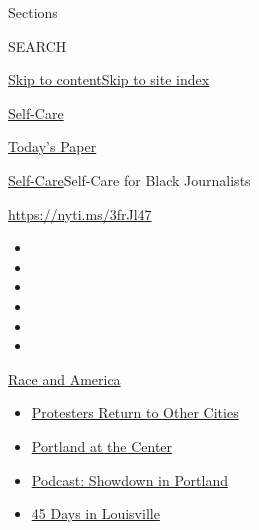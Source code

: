 Sections

SEARCH

\protect\hyperlink{site-content}{Skip to
content}\protect\hyperlink{site-index}{Skip to site index}

\href{https://www.nytimes3xbfgragh.onion/section/style/self-care/}{Self-Care}

\href{https://myaccount.nytimes3xbfgragh.onion/auth/login?response_type=cookie\&client_id=vi}{}

\href{https://www.nytimes3xbfgragh.onion/section/todayspaper}{Today's
Paper}

\href{/section/style/self-care/}{Self-Care}\textbar{}Self-Care for Black
Journalists

\url{https://nyti.ms/3frJl47}

\begin{itemize}
\item
\item
\item
\item
\item
\item
\end{itemize}

\href{https://www.nytimes3xbfgragh.onion/news-event/george-floyd-protests-minneapolis-new-york-los-angeles?action=click\&pgtype=Article\&state=default\&region=TOP_BANNER\&context=storylines_menu}{Race
and America}

\begin{itemize}
\tightlist
\item
  \href{https://www.nytimes3xbfgragh.onion/2020/07/26/us/protests-portland-seattle-trump.html?action=click\&pgtype=Article\&state=default\&region=TOP_BANNER\&context=storylines_menu}{Protesters
  Return to Other Cities}
\item
  \href{https://www.nytimes3xbfgragh.onion/2020/07/24/us/portland-oregon-protests-white-race.html?action=click\&pgtype=Article\&state=default\&region=TOP_BANNER\&context=storylines_menu}{Portland
  at the Center}
\item
  \href{https://www.nytimes3xbfgragh.onion/2020/07/23/podcasts/the-daily/portland-protests.html?action=click\&pgtype=Article\&state=default\&region=TOP_BANNER\&context=storylines_menu}{Podcast:
  Showdown in Portland}
\item
  \href{https://www.nytimes3xbfgragh.onion/interactive/2020/07/16/us/black-lives-matter-protests-louisville-breonna-taylor.html?action=click\&pgtype=Article\&state=default\&region=TOP_BANNER\&context=storylines_menu}{45
  Days in Louisville}
\end{itemize}

